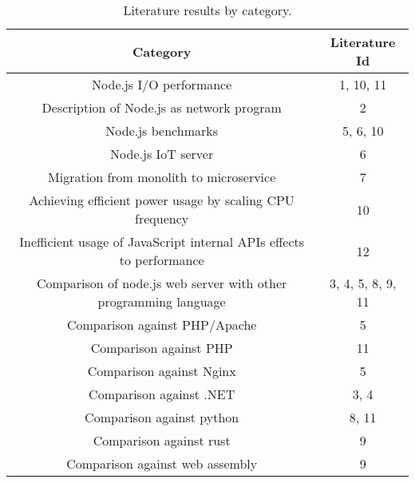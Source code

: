 \begin{table}[ht!]
    \begin{tabular}{|c c|} 
        \hline
        Category
        & Literature Id
        \\ 
        \hline\hline
        Node.js I/O performance
        & 1, 10, 11
        \\ 
    
        Description of Node.js as network program
        & 2
        \\ 
    
        Node.js benchmarks
        & 5, 6, 10
        \\ 
    
        Node.js IoT server
        & 6
        \\ 
    
        Migration from monolith to microservice
        & 7
        \\ 
    
        Achieving efficient power usage by scaling CPU frequency
        & 10
        \\ 
    
        Inefficient usage of JavaScript internal APIs effects to performance
        & 12
        \\ 
    
        Comparison of node.js web server with other programming language
        & 3, 4, 5, 8, 9, 11
        \\ 
    
        Comparison against PHP/Apache
        & 5
        \\ 
    
        Comparison against PHP
        & 11
        \\ 
    
        Comparison against Nginx
        & 5
        \\
    
        Comparison against .NET
        & 3, 4
        \\
    
        Comparison against python
        & 8, 11
        \\
    
        Comparison against rust
        & 9
        \\
    
        Comparison against web assembly
        & 9
        \\
        \hline
    \end{tabular}    
    \caption{Literature results by category.}
    \label{table:literature:resulstByCategory}
\end{table}

